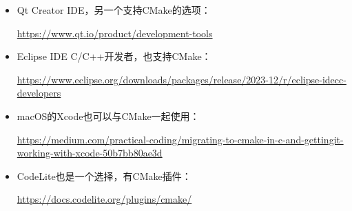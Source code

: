 

\begin{itemize}
\item
Qt Creator IDE，另一个支持CMake的选项：

\url{https://www.qt.io/product/development-tools}

\item
Eclipse IDE C/C++开发者，也支持CMake：

\url{https://www.eclipse.org/downloads/packages/release/2023-12/r/eclipse-idecc-developers}

\item
macOS的Xcode也可以与CMake一起使用：

\url{https://medium.com/practical-coding/migrating-to-cmake-in-c-and-gettingit-working-with-xcode-50b7bb80ae3d}

\item
CodeLite也是一个选择，有CMake插件：

\url{https://docs.codelite.org/plugins/cmake/}
\end{itemize}
